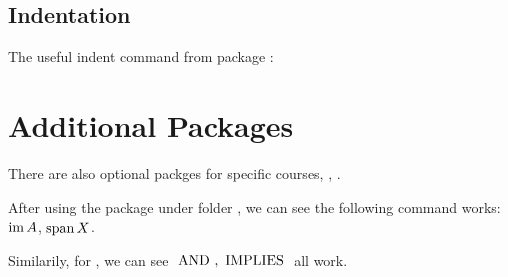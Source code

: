 \documentclass[12pt, brown, sepia, 0.5in]{alittlebear}
\begin{document}
\subsection{Indentation}

The useful indent command from package :


\np
\section{Additional Packages}

There are also optional packges for specific courses, \eg, .

After using the  package under folder , we can see the following command works: $\operatorname{im} A$, $\operatorname{span} X$.

Similarily, for , we can see $\,\,\mathrm{AND}\,\,, \,\,\mathrm{IMPLIES}\,\,$ all work.
\end{document}
